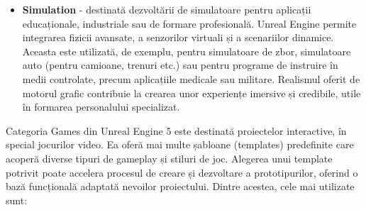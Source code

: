 \begin{itemize}
\item \textbf{Simulation} - destinată dezvoltării de simulatoare pentru aplicații educaționale, industriale sau de formare profesională. Unreal Engine permite integrarea fizicii avansate, a senzorilor virtuali și a scenariilor dinamice. Aceasta este utilizată, de exemplu, pentru simulatoare de zbor, simulatoare auto (pentru camioane, trenuri etc.) sau pentru programe de instruire în medii controlate, precum aplicațiile medicale sau militare. Realismul oferit de motorul grafic contribuie la crearea unor experiențe imersive și credibile, utile în formarea personalului specializat.

\end{itemize}

Categoria Games din Unreal Engine 5 este destinată proiectelor interactive, în special jocurilor video. Ea oferă mai multe șabloane (templates) predefinite care acoperă diverse tipuri de gameplay și stiluri de joc. Alegerea unui template potrivit poate accelera procesul de creare și dezvoltare a prototipurilor, oferind o bază funcțională adaptată nevoilor proiectului. Dintre acestea, cele mai utilizate sunt:

